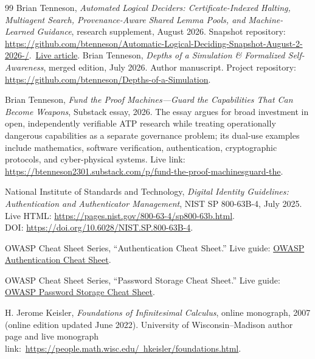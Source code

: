 \documentclass[11pt,openany]{book}
\theoremstyle{definition}
\theoremstyle{remark}
\begin{document}
\begin{thebibliography}{99}
Brian Tenneson,
\emph{Automated Logical Deciders: Certificate-Indexed Halting, Multiagent Search, Provenance-Aware Shared Lemma Pools, and Machine-Learned Guidance}, research supplement, August 2026.
Snapshot repository: \href{https://github.com/btenneson/Automatic-Logical-Deciding-Snapshot-August-2-2026-}{https://github.com/btenneson/Automatic-Logical-Deciding-Snapshot-August-2-2026-/}.\ \href{https://btenneson.github.io/pub/papers/ald_certificate_halting_shared_lemma_pools/}{Live article}.
Brian Tenneson,
\emph{Depths of a Simulation \& Formalized Self-Awareness}, merged edition, July 2026. Author manuscript. Project repository: \href{https://github.com/btenneson/Depths-of-a-Simulation}{https://github.com/btenneson/Depths-of-a-Simulation}.



Brian Tenneson,
\emph{Fund the Proof Machines---Guard the Capabilities That Can Become Weapons}, Substack essay, 2026. The essay argues for broad investment in open, independently verifiable ATP research while treating operationally dangerous capabilities as a separate governance problem; its dual-use examples include mathematics, software verification, authentication, cryptographic protocols, and cyber-physical systems.
Live link: \href{https://btenneson2301.substack.com/p/fund-the-proof-machinesguard-the}{https://btenneson2301.substack.com/p/fund-the-proof-machinesguard-the}.

National Institute of Standards and Technology,
\emph{Digital Identity Guidelines: Authentication and Authenticator Management}, NIST SP 800-63B-4, July 2025.
Live HTML: \href{https://pages.nist.gov/800-63-4/sp800-63b.html}{https://pages.nist.gov/800-63-4/sp800-63b.html}.\\
DOI: \href{https://doi.org/10.6028/NIST.SP.800-63B-4}{https://doi.org/10.6028/NIST.SP.800-63B-4}.

OWASP Cheat Sheet Series,
``Authentication Cheat Sheet.''
Live guide: \href{https://cheatsheetseries.owasp.org/cheatsheets/Authentication_Cheat_Sheet.html}{OWASP Authentication Cheat Sheet}.

OWASP Cheat Sheet Series,
``Password Storage Cheat Sheet.''
Live guide: \href{https://cheatsheetseries.owasp.org/cheatsheets/Password_Storage_Cheat_Sheet.html}{OWASP Password Storage Cheat Sheet}.


H. Jerome Keisler,
\emph{Foundations of Infinitesimal Calculus}, online monograph, 2007 (online edition updated June 2022).
University of Wisconsin--Madison author page and live monograph link:\
\href{https://people.math.wisc.edu/~hkeisler/foundations.html}{https://people.math.wisc.edu/~hkeisler/foundations.html}.

\end{thebibliography}
\end{document}
